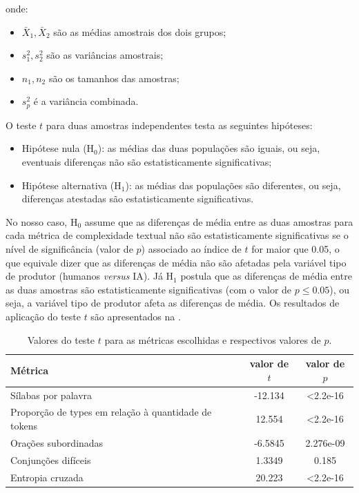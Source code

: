 \documentclass[portuguese]{textolivre}
\begin{document}
onde:
\begin{itemize}
\item \( \bar{X}_1, \bar{X}_2 \) são as médias amostrais dos dois grupos;
\item \( s_1^2, s_2^2 \) são as variâncias amostrais;
\item \( n_1, n_2 \) são os tamanhos das amostras;
\item \( s_p^2 \) é a variância combinada.
\end{itemize}

O teste $t$ para duas amostras independentes testa as seguintes hipóteses:
\begin{itemize}
\item Hipótese nula (H$_0$): as médias das duas populações são iguais, ou seja, eventuais diferenças não são estatisticamente significativas;
\item Hipótese alternativa (H$_1$): as médias das populações são diferentes, ou seja, diferenças atestadas são estatisticamente significativas.
\end{itemize}

No nosso caso, H$_0$ assume que as diferenças de média entre as duas amostras para cada métrica de complexidade textual não são estatisticamente significativas se o nível de significância (valor de $p$) associado ao índice de $t$ for maior que 0.05, o que equivale dizer que as diferenças de média não são afetadas pela variável tipo de produtor (humanos \emph{versus} IA).
Já H$_1$ postula que as diferenças de média entre as duas amostras são estatisticamente significativas (com o valor de $p \leq 0.05$), ou seja, a variável tipo de produtor afeta as diferenças de média.
Os resultados de aplicação do teste $t$ são apresentados na .

\begin{table}[htpb]
\centering
\begin{threeparttable}
\caption{Valores do teste $t$ para as métricas escolhidas e respectivos valores de $p$.}
\label{tbl-tabela-02}
\begin{tabular}{lcc}
\toprule 
Métrica & valor de $t$ & valor de $p$ \\ 
\midrule
  Sílabas por palavra & -12.134 & <2.2e-16 \\
  Proporção de types em relação à quantidade de tokens & 12.554 & <2.2e-16 \\
  Orações subordinadas & -6.5845 & 2.276e-09 \\ 
  Conjunções difíceis & 1.3349 & 0.185 \\
  Entropia cruzada & 20.223 & <2.2e-16 \\
\bottomrule
\end{tabular}
\end{threeparttable}
\end{table}
\end{document}
